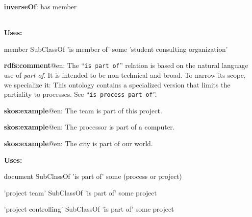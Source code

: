 \documentclass[a4paper, DIV=13, BCOR=0cm]{scrbook}
\newcommand{\relation}[1]{\texttt{#1}}
\begin{document}
\begin{mdframed}[style=onto, frametitle={is member of}]
	{%
		\begin{compactitem}
			\item \textbf{inverseOf}: has member
		\end{compactitem}
		\hrulefill\\
		\textbf{Uses:}
		\begin{compactitem}
			\item member SubClassOf 'is member of' some 'student consulting organization'
		\end{compactitem}
	} %
\end{mdframed}

\begin{mdframed}[style=onto, frametitle={is part of}]
	{%
		\begin{compactitem}
			\item \textbf{rdfs:comment}@en: The \enquote{\relation{is part of}} relation is based on the natural language use of \textit{part of}. It is intended to be non-technical and broad. To narrow its scope, we specialize it: This ontology contains a specialized version that limits the partiality to processes. See \enquote{\relation{is process part of}}.
			\item \textbf{skos:example}@en: The team is part of this project.
			\item \textbf{skos:example}@en: The processor is part of a computer.
			\item \textbf{skos:example}@en: The city is part of our world.
		\end{compactitem}
		\textbf{Uses:}
		\begin{compactitem}
			\item document SubClassOf 'is part of' some 
			(process or project)
			\item 'project team' SubClassOf 'is part of' some project
			\item 'project controlling' SubClassOf 'is part of' some project
		\end{compactitem}
	} %
\end{mdframed}
\end{document}
